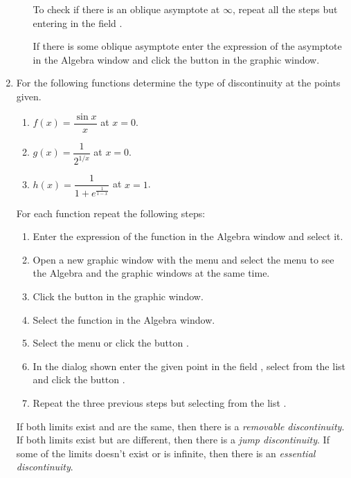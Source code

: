 \begin{enumerate}[leftmargin=*]
\begin{enumerate}
\begin{indication}
To check if there is an oblique asymptote at $\infty$, repeat all the steps but entering  in the field .
 
If there is some oblique asymptote enter the expression of the asymptote in the Algebra window and click the button  in the graphic window.
\end{indication}
\end{enumerate}

\item For the following functions determine the type of discontinuity at the points given.
\begin{enumerate}
\item $f(x)=\dfrac{\sin x}{x}$ at $x=0$.
\item $g(x)=\dfrac{1}{2^{1/x}}$ at $x=0$.
\item $h(x)=\dfrac{1}{1+e^{\frac{1}{1-x}}}$ at $x=1$.
\end{enumerate}

\begin{indication}
For each function  repeat the following steps:
\begin{enumerate}
\item Enter the expression of the function in the Algebra window and select it.
\item Open a new graphic window with the menu  and select the menu  to see the Algebra and the graphic windows at the same time.  
\item Click the button  in the graphic window.
\item Select the function in the Algebra window.
\item Select the menu  or click the button .
\item In the dialog shown enter the given point in the field , select  from the list  and click the button . 
\item Repeat the three previous steps but selecting  from the list .
\end{enumerate}
If both limits exist and are the same, then there is a \emph{removable discontinuity}. 
If both limits exist but are different, then there is a \emph{jump discontinuity}.
If some of the limits doesn't exist or is infinite, then there is an \emph{essential discontinuity}.  
\end{indication}



\end{enumerate}
